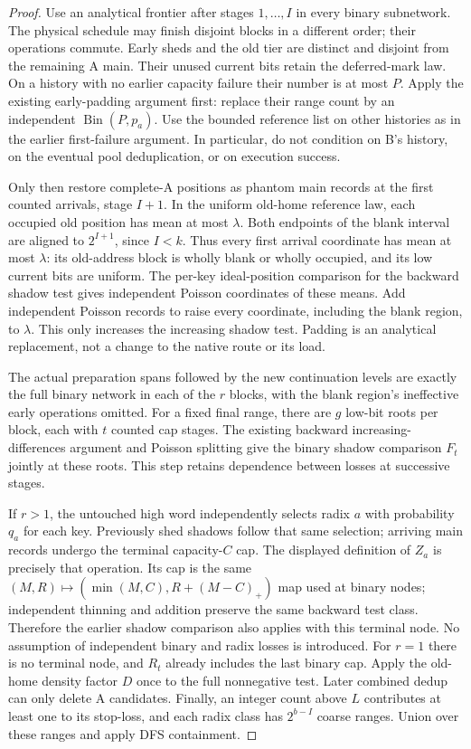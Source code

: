 \documentclass[11pt]{article}
\theoremstyle{definition}
\theoremstyle{remark}
\begin{document}
\begin{proof}
Use an analytical frontier after stages $1,\ldots,I$ in every binary
subnetwork. The physical schedule may finish disjoint blocks in a different
order; their operations commute. Early sheds and the old tier are distinct
and disjoint from the remaining A main. Their unused current bits retain
the deferred-mark law. On a history with no earlier capacity failure their
number is at most $P$. Apply the existing early-padding argument first:
replace their range count by an independent $\operatorname{Bin}(P,p_a)$.
Use the bounded reference list on other histories as in the earlier
first-failure argument. In particular, do not condition on B's history,
on the eventual pool deduplication, or on execution success.

Only then restore complete-A positions as phantom main records at the
first counted arrivals, stage $I+1$. In the uniform old-home reference law,
each occupied old position has mean at most $\lambda$. Both endpoints of
the blank interval are aligned to $2^{I+1}$, since $I<k$. Thus every first
arrival coordinate has mean at most $\lambda$: its old-address block is
wholly blank or wholly occupied, and its low current bits are uniform.
The per-key ideal-position comparison for the backward shadow test gives
independent Poisson coordinates of these means. Add independent Poisson
records to raise every coordinate, including the blank region, to
$\lambda$. This only increases the increasing shadow test. Padding is an
analytical replacement, not a change to the native route or its load.

The actual preparation spans followed by the new continuation levels are
exactly the full binary network in each of the $r$ blocks, with the blank
region's ineffective early operations omitted. For a fixed final range,
there are $g$ low-bit roots per block, each with $t$ counted cap stages.
The existing backward increasing-differences argument and Poisson splitting
give the binary shadow comparison $F_t$ jointly at these roots. This step
retains dependence between losses at successive stages.

If $r>1$, the untouched high word independently selects radix $a$ with
probability $q_a$ for each key. Previously shed shadows follow that same
selection; arriving main records undergo the terminal capacity-$C$ cap.
The displayed definition of $Z_a$ is precisely that operation. Its cap is
the same $(M,R)\mapsto(\min(M,C),R+(M-C)_+)$ map used at binary nodes;
independent thinning and addition preserve the same backward test class.
Therefore the earlier shadow comparison also applies with this terminal
node. No assumption of independent binary and radix losses is introduced.
For $r=1$ there is no terminal node, and $R_t$ already includes the last
binary cap. Apply the old-home density factor $D$ once to the full
nonnegative test. Later combined dedup can only delete A candidates.
Finally, an integer count above $L$ contributes at least one to its
stop-loss, and each radix class has $2^{b-I}$ coarse ranges. Union over
these ranges and apply DFS containment.
\end{proof}
\end{document}
